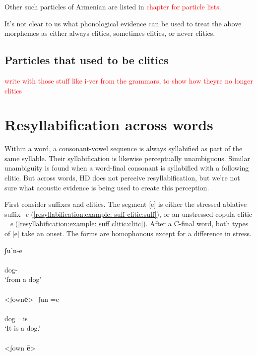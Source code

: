 Other such particles of Armenian are listed in \textcolor{red}{chapter for particle lists}. 


It's not clear to us what phonological evidence can be used to treat the above morphemes as either always clitics, sometimes clitics, or never clitics. 
\subsection{Particles that used to be clitics}\label{section:intonation:clitic:old}
\textcolor{red}{write with those stuff like i-ver from the grammars, to show how theyre no longer clitics}
\section{Resyllabification across words}\label{section:intonation:resyll}
Within a word, a consonant-vowel sequence is always  syllabified as part of the same syllable. Their syllabification is likewise perceptually unambiguous. Similar unambiguity is found when a word-final consonant is syllabified with a following clitic. But across words, HD does not perceive resyllabification, but we're not sure what acoustic evidence is being used to create this perception. 

First consider suffixes and clitics. The segment [e] is either the stressed ablative suffix \textit{-e} (\ref{resyllabification:example: suff clitic:suff}), or an unstressed copula clitic \textit{=e} (\ref{resyllabification:example: suff clitic:clitc}). After a C-final word, both types of [e] take an onset. The forms are homophonous except for a difference in stress. 

\begin{exe}
	\ex 
	\begin{xlist}
		\ex \glll ʃuˈn-e \\
		[ʃu.ˈ{ne}] \\
		dog-{\abl}\\
		\trans `from a dog' \label{resyllabification:example: suff clitic:suff} \\
		 \\
		<ʃown\textbf{ē}> 
		\ex \glll   ˈ{ʃu}n =e \\
		[ˈ{ʃu}. ne] \\
		dog =is \\
		\trans `It is a dog.' \label{resyllabification:example: suff clitic:clitc} \\
		 \\
		<ʃown \textbf{ē}> 
	\end{xlist}
\end{exe}


